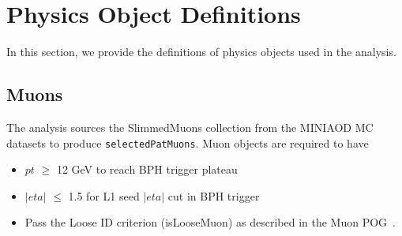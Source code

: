\clearpage
\chapter{Physics Object Definitions}\label{sec:objects}

In this section, we provide the definitions of physics objects used in the analysis.

\section{Muons}\label{sec:muons}


The analysis sources the SlimmedMuons collection from the MINIAOD MC datasets to produce {\tt selectedPatMuons}.
Muon objects are required to have 
\begin{itemize}
  \item $pt$ $\geq$ 12 GeV to reach BPH trigger plateau
  \item $|eta|$ $\leq$ 1.5 for L1 seed $|eta|$ cut in BPH trigger
  \item Pass the Loose ID criterion (isLooseMuon) as described in the Muon POG~\cite{muonpog}.
\end{itemize}


